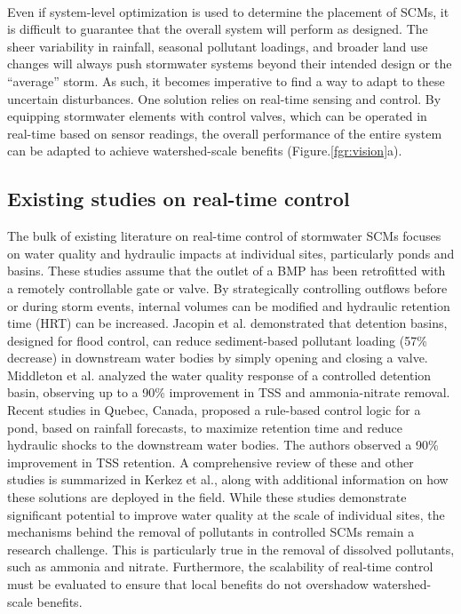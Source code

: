 \

Even if system-level optimization is used to determine the placement of SCMs\cite{Ciou2012OptimizationWatershed,Zhen2004OptimalScale}, it is difficult to guarantee that the overall system will perform as designed.
The sheer variability in rainfall\cite{Chaubey1999UncertaintyRainfall}, seasonal pollutant loadings\cite{Ouyang2006AssessmentQuality}, and broader land use changes\cite{Goonetilleke2005UnderstandingManagement} will always push stormwater systems beyond their intended design or the ``average'' storm\cite{DepartmentofEnvironmentalProtection2006PennsylvaniaManual}.
As such, it becomes imperative to find a way to adapt to these uncertain disturbances.
One solution relies on real-time sensing and control.
By equipping stormwater elements with control valves, which can be operated in real-time based on sensor readings, the overall performance of the entire system can be adapted to achieve watershed-scale benefits (Figure.\ref{fgr:vision}a). 

\subsection{Existing studies on real-time control}

The bulk of existing literature on real-time control of stormwater SCMs focuses on water quality and hydraulic impacts at individual sites, particularly ponds and basins.
These studies assume that the outlet of a BMP has been retrofitted with a remotely controllable gate or valve.
By strategically controlling outflows before or during storm events, internal volumes can be modified and hydraulic retention time (HRT) can be increased.
Jacopin et al.\cite{Jacopin2001OptimisationBasins} demonstrated that detention basins, designed for flood control, can reduce sediment-based pollutant loading (57\% decrease) in downstream water bodies by simply opening and closing a valve.
Middleton et al.\cite{Middleton2008WaterBasin} analyzed the water quality response of a controlled detention basin, observing up to a 90\% improvement in TSS and ammonia-nitrate removal.
Recent studies\cite{Muschalla2014Ecohydraulic-drivenBasins,
  Gaborit2013ImprovingForecasts,Gaborit2015ExploringPonds} in Quebec, Canada,
proposed a rule-based control logic for a pond, based on rainfall forecasts, to
maximize retention time and  reduce hydraulic shocks to the downstream water
bodies. The authors observed a 90\% improvement in TSS retention. A
comprehensive review of these and other studies is summarized in Kerkez et al.\cite{Kerkez2016SmarterSystems}, along with additional information on how these solutions are deployed in the field. 
While these studies demonstrate significant potential to improve water quality at the scale of individual sites, the mechanisms behind the removal of pollutants in controlled SCMs remain a research challenge. This is particularly true in the removal of dissolved pollutants, such as ammonia and nitrate. Furthermore, the scalability of  real-time control must be evaluated to ensure that local benefits do not overshadow watershed-scale benefits. 



